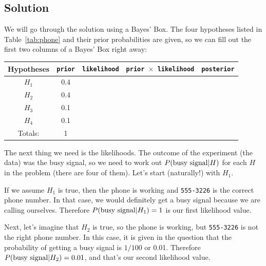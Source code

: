\subsection{Solution}
We will go through the solution using a Bayes' Box. The four hypotheses listed
in Table~\ref{tab:phone} and their prior probabilities are given, so we can fill
out the first two columns of a Bayes' Box right away:
\begin{table}[h!]
\begin{center}
\begin{tabular}{|c|c|c|c|c|}
\hline
{\bf Hypotheses} & {\tt prior} & {\tt likelihood} &
{\tt prior $\times$ likelihood} & {\tt posterior}\\
\hline
$H_1$ & 0.4 &  &  & \\
$H_2$ & 0.4 &  &  & \\
$H_3$ & 0.1 &  &  & \\
$H_4$ & 0.1 &  &  & \\
\hline
Totals: & 1 & & & \\
\hline
\end{tabular}
\end{center}
\end{table}
The next thing we need is the likelihoods. The outcome of the experiment (the
data) was the busy signal, so we need to work out $P(\textnormal{busy signal} | H)$ for each $H$
in the problem (there are four of them). Let's start (naturally!) with $H_1$.

If we assume $H_1$ is true, then the phone is working and {\tt 555-3226} is the
correct phone number. In that case, we would definitely get a busy signal
because we are calling ourselves. Therefore
$P(\textnormal{busy signal} | H_1) = 1$ is our first likelihood value.

Next, let's imagine that $H_2$ is true, so the phone is working, but
{\tt 555-3226} is not the right phone number. In this case, it is given in the
question that the probability of getting a busy signal is $1/100$ or 0.01.
Therefore $P(\textnormal{busy signal} | H_2) = 0.01$, and that's our second
likelihood value.

